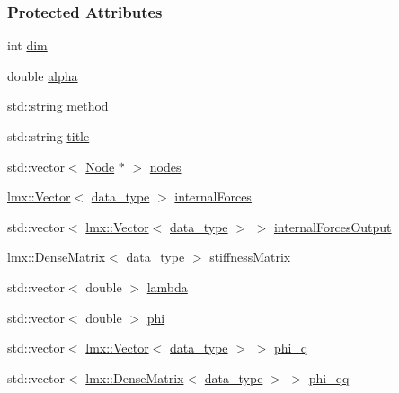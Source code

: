 \subsubsection*{Protected Attributes}
\begin{DoxyCompactItemize}
\item 
int \hyperlink{classmknix_1_1_constraint_a5fa3727603b390206e6431141b892517}{dim}
\item 
double \hyperlink{classmknix_1_1_constraint_ab76845f20e7a29693b9161e09074d55a}{alpha}
\item 
std\+::string \hyperlink{classmknix_1_1_constraint_ab05c0dcc5cc535f4e3bed2fd34ed6d75}{method}
\item 
std\+::string \hyperlink{classmknix_1_1_constraint_ae245e7947a6ae56d5d0c42b31059af72}{title}
\item 
std\+::vector$<$ \hyperlink{classmknix_1_1_node}{Node} $\ast$ $>$ \hyperlink{classmknix_1_1_constraint_aa4aa16e121963acf4c086f63137d4ac1}{nodes}
\item 
\hyperlink{classlmx_1_1_vector}{lmx\+::\+Vector}$<$ \hyperlink{namespacemknix_a16be4b246fbf2cceb141e3a179111020}{data\+\_\+type} $>$ \hyperlink{classmknix_1_1_constraint_a0b0fbbf149c32ce0a9dd6e0c4dd5851e}{internal\+Forces}
\item 
std\+::vector$<$ \hyperlink{classlmx_1_1_vector}{lmx\+::\+Vector}$<$ \hyperlink{namespacemknix_a16be4b246fbf2cceb141e3a179111020}{data\+\_\+type} $>$ $>$ \hyperlink{classmknix_1_1_constraint_aa89cb49b380633ff83730683c119f966}{internal\+Forces\+Output}
\item 
\hyperlink{classlmx_1_1_dense_matrix}{lmx\+::\+Dense\+Matrix}$<$ \hyperlink{namespacemknix_a16be4b246fbf2cceb141e3a179111020}{data\+\_\+type} $>$ \hyperlink{classmknix_1_1_constraint_ab4b508cdbea36124b925f52525a1d5ad}{stiffness\+Matrix}
\item 
std\+::vector$<$ double $>$ \hyperlink{classmknix_1_1_constraint_aeee7c3bdd61194e3df0e958ff237040a}{lambda}
\item 
std\+::vector$<$ double $>$ \hyperlink{classmknix_1_1_constraint_a10e027fc12cb248a49a1ded049f0a161}{phi}
\item 
std\+::vector$<$ \hyperlink{classlmx_1_1_vector}{lmx\+::\+Vector}$<$ \hyperlink{namespacemknix_a16be4b246fbf2cceb141e3a179111020}{data\+\_\+type} $>$ $>$ \hyperlink{classmknix_1_1_constraint_a667ecb78177b06981c30e23cb194b806}{phi\+\_\+q}
\item 
std\+::vector$<$ \hyperlink{classlmx_1_1_dense_matrix}{lmx\+::\+Dense\+Matrix}$<$ \hyperlink{namespacemknix_a16be4b246fbf2cceb141e3a179111020}{data\+\_\+type} $>$ $>$ \hyperlink{classmknix_1_1_constraint_a9173b52da189652951ce51b1d69fcde4}{phi\+\_\+qq}
\end{DoxyCompactItemize}


